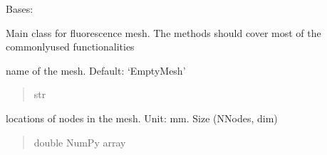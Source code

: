 \documentclass[letterpaper,10pt,english]{sphinxmanual}
\begin{document}
\begin{fulllineitems}
\label{\detokenize{_autosummary/nirfasterff.base.fluor_mesh.fluormesh:nirfasterff.base.fluor_mesh.fluormesh}}
\pysigstartsignatures
\pysigline
{}
\pysigstopsignatures
\sphinxAtStartPar
Bases: {\hyperref[\detokenize{_autosummary/nirfasterff.base.mesh.mesh:nirfasterff.base.mesh.mesh}]{}}

\sphinxAtStartPar
Main class for fluorescence mesh. The methods should cover most of the commonly\sphinxhyphen{}used functionalities

\begin{fulllineitems}
\label{\detokenize{_autosummary/nirfasterff.base.fluor_mesh.fluormesh:nirfasterff.base.fluor_mesh.fluormesh.name}}
\pysigstartsignatures
\pysigline
{}
\pysigstopsignatures
\sphinxAtStartPar
name of the mesh. Default: ‘EmptyMesh’
\begin{quote}\begin{description}
\sphinxAtStartPar
str

\end{description}\end{quote}

\end{fulllineitems}


\begin{fulllineitems}
\label{\detokenize{_autosummary/nirfasterff.base.fluor_mesh.fluormesh:nirfasterff.base.fluor_mesh.fluormesh.nodes}}
\pysigstartsignatures
\pysigline
{}
\pysigstopsignatures
\sphinxAtStartPar
locations of nodes in the mesh. Unit: mm. Size (NNodes, dim)
\begin{quote}\begin{description}
\sphinxAtStartPar
double NumPy array

\end{description}\end{quote}


\end{fulllineitems}
\end{fulllineitems}
\end{document}
